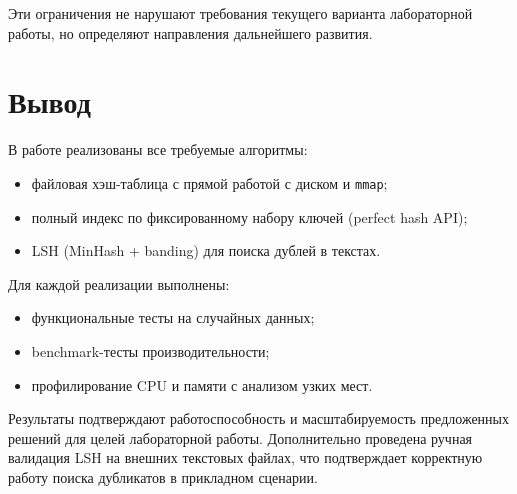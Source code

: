\documentclass{itmo}
\begin{document}
Эти ограничения не нарушают требования текущего варианта лабораторной работы,
но определяют направления дальнейшего развития.

\chapter{Вывод}

В работе реализованы все требуемые алгоритмы:
\begin{itemize}
	\item файловая хэш-таблица с прямой работой с диском и \texttt{mmap};
	\item полный индекс по фиксированному набору ключей (perfect hash API);
	\item LSH (MinHash + banding) для поиска дублей в текстах.
\end{itemize}

Для каждой реализации выполнены:
\begin{itemize}
	\item функциональные тесты на случайных данных;
	\item benchmark-тесты производительности;
	\item профилирование CPU и памяти с анализом узких мест.
\end{itemize}

Результаты подтверждают работоспособность и масштабируемость предложенных решений для целей лабораторной работы.
Дополнительно проведена ручная валидация LSH на внешних текстовых файлах,
что подтверждает корректную работу поиска дубликатов в прикладном сценарии.
\end{document}
